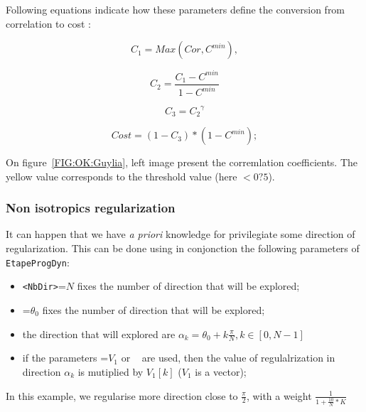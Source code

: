 Following equations indicate how these parameters define the conversion from correlation to cost :

\begin{equation}
    C_1=Max(Cor,C^{min}) , 
\end{equation}

\begin{equation}
   C_2 = \frac{C_1 -C^{min}}{1-C^{min}}
\end{equation}

\begin{equation}
   C_3 = {C_2} ^\gamma
\end{equation}

\begin{equation}
   Cost  = (1-C_3) * (1-C^{min});
\end{equation}

On figure~\ref{FIG:OK:Guylia}, left image present the corremlation coefficients. The yellow value corresponds to the threshold value (here $<0?5$).


\subsubsection{Non isotropics regularization}

It can happen that we have \emph{a priori} knowledge for privilegiate some direction of regularization.
This can be done using in conjonction the following parameters of {\tt EtapeProgDyn}:

\begin{itemize}
   \item  {\tt  <NbDir>}=$N$  fixes the number of direction that will be explored;
   \item  {\tt  <Teta0>}=$\theta_0$  fixes the number of direction that will be explored;
   \item  the direction that will explored are $\alpha_k=\theta_0 + k\frac{\pi}{N} , k\in[0,N-1]$
   \item if the parameters  {\tt <Px1MultRegul>}=$V_1$ or {\tt <Px2MultRegul> } are used, then the value
         of regulalrization in direction  $\alpha_k$ is  mutiplied by $V_1[k]$ ($V_1$ is a vector);
\end{itemize}

In this example, we regularise more direction close to $\frac{\pi}{2}$, with a weight 
$\frac{1}{1+\frac{10}{N}*K}$




